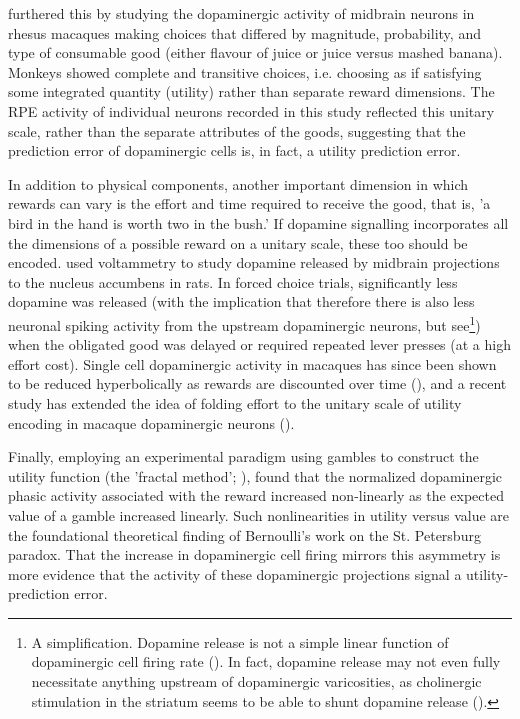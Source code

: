 \cite{lakDopaminePredictionError2014} furthered this by studying the dopaminergic activity of midbrain neurons in rhesus macaques making choices that differed by magnitude, probability, and type of consumable good (either flavour of juice or juice versus mashed banana). Monkeys showed complete and transitive choices, i.e. choosing as if satisfying some integrated quantity (utility) rather than separate reward dimensions. The RPE activity of individual neurons recorded in this study reflected this unitary scale, rather than the separate attributes of the goods, suggesting that the prediction error of dopaminergic cells is, in fact, a utility prediction error.

In addition to physical components, another important dimension in which rewards can vary is the effort and time required to receive the good, that is, 'a bird in the hand is worth two in the bush.' If dopamine signalling incorporates all the dimensions of a possible reward on a unitary scale, these too should be encoded. \cite{dayAssociativeLearningMediates2007} used voltammetry to study dopamine released by midbrain projections to the nucleus accumbens in rats. In forced choice trials, significantly less dopamine was released (with the implication that therefore there is also less neuronal spiking activity from the upstream dopaminergic neurons, but see\footnote{A simplification. Dopamine release is not a simple linear function of dopaminergic cell firing rate (\cite{mohebiDissociableDopamineDynamics2019}). In fact, dopamine release may not even fully necessitate anything upstream of dopaminergic varicosities, as cholinergic stimulation in the striatum seems to be able to shunt dopamine release (\cite{mohebiDopamineReleaseDrives2020}).}) when the obligated good was delayed or required repeated lever presses (at a high effort cost). Single cell dopaminergic activity in macaques has since been shown to be reduced hyperbolically as rewards are discounted over time (\cite{kobayashiInfluenceRewardDelays2008}), and a recent study has extended the idea of folding effort to the unitary scale of utility encoding in macaque dopaminergic neurons (\cite{burrellWorthWorkMonkeys2023}).

Finally, employing an experimental paradigm using gambles to construct the utility function (the 'fractal method'; \cite{machinaChoiceUncertaintyProblems1987}), \cite{staufferDopamineRewardPrediction2014} found that the normalized dopaminergic phasic activity associated with the reward increased non-linearly as the expected value of a gamble increased linearly. Such nonlinearities in utility versus value are the foundational theoretical finding of Bernoulli's work on the St. Petersburg paradox. That the increase in dopaminergic cell firing mirrors this asymmetry is more evidence that the activity of these dopaminergic projections signal a utility-prediction error.

